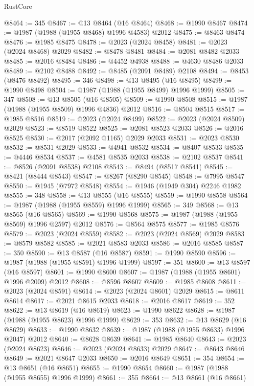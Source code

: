 \begin{lexlean}{RustCore}
\begin{coremodule}
@8464 := 345
@8467 := @13 @8464 (@16 @8464)
@8468 := @1990 @8467
@8474 := @1987 (@1988 (@1955 @8468) @1996 @4583) @2012
@8475 := @8463 @8474
@8476 := @1985 @8475
@8478 := @2023 (@2024 @8458)
@8481 := @2023 (@2024 @8468) @2029
@8482 := @8478 @8481
@8484 := @2081 @8482 @2033
@8485 := @2016 @8484
@8486 := @4452 @4938
@8488 := @4630 @8486 @2033
@8489 := @2102 @8488
@8492 := @8485 (@2091 @8489) @2108
@8494 := @8453 (@8476 @8492)
@8495 := 346
@8498 := @13 @8495 (@16 @8495)
@8499 := @1990 @8498
@8504 := @1987 (@1988 (@1955 @8499) @1996 @1999)
@8505 := 347
@8508 := @13 @8505 (@16 @8505)
@8509 := @1990 @8508
@8515 := @1987 (@1988 (@1955 @8509) @1996 @4836) @2012
@8516 := @8504 @8515
@8517 := @1985 @8516
@8519 := @2023 (@2024 @8499)
@8522 := @2023 (@2024 @8509) @2029
@8523 := @8519 @8522
@8525 := @2081 @8523 @2033
@8526 := @2016 @8525
@8530 := @2017 (@2092 @1165) @2029 @2033
@8531 := @2023 @8530
@8532 := @8531 @2029
@8533 := @4941 @8532
@8534 := @8407 @8533
@8535 := @4446 @8534
@8537 := @4581 @8535 @2033
@8538 := @2102 @8537
@8541 := @8526 (@2091 @8538) @2108
@8543 := @8494 (@8517 @8541)
@8545 := @8421 (@8444 @8543)
@8547 := @8267 (@8290 @8545)
@8548 := @7995 @8547
@8550 := @1945 (@7972 @8548)
@8554 := @1946 (@1949 @304) @2246 @1982
@8555 := 348
@8558 := @13 @8555 (@16 @8555)
@8559 := @1990 @8558
@8564 := @1987 (@1988 (@1955 @8559) @1996 @1999)
@8565 := 349
@8568 := @13 @8565 (@16 @8565)
@8569 := @1990 @8568
@8575 := @1987 (@1988 (@1955 @8569) @1996 @2597) @2012
@8576 := @8564 @8575
@8577 := @1985 @8576
@8579 := @2023 (@2024 @8559)
@8582 := @2023 (@2024 @8569) @2029
@8583 := @8579 @8582
@8585 := @2021 @8583 @2033
@8586 := @2016 @8585
@8587 := 350
@8590 := @13 @8587 (@16 @8587)
@8591 := @1990 @8590
@8596 := @1987 (@1988 (@1955 @8591) @1996 @1999)
@8597 := 351
@8600 := @13 @8597 (@16 @8597)
@8601 := @1990 @8600
@8607 := @1987 (@1988 (@1955 @8601) @1996 @2009) @2012
@8608 := @8596 @8607
@8609 := @1985 @8608
@8611 := @2023 (@2024 @8591)
@8614 := @2023 (@2024 @8601) @2029
@8615 := @8611 @8614
@8617 := @2021 @8615 @2033
@8618 := @2016 @8617
@8619 := 352
@8622 := @13 @8619 (@16 @8619)
@8623 := @1990 @8622
@8628 := @1987 (@1988 (@1955 @8623) @1996 @1999)
@8629 := 353
@8632 := @13 @8629 (@16 @8629)
@8633 := @1990 @8632
@8639 := @1987 (@1988 (@1955 @8633) @1996 @2047) @2012
@8640 := @8628 @8639
@8641 := @1985 @8640
@8643 := @2023 (@2024 @8623)
@8646 := @2023 (@2024 @8633) @2029
@8647 := @8643 @8646
@8649 := @2021 @8647 @2033
@8650 := @2016 @8649
@8651 := 354
@8654 := @13 @8651 (@16 @8651)
@8655 := @1990 @8654
@8660 := @1987 (@1988 (@1955 @8655) @1996 @1999)
@8661 := 355
@8664 := @13 @8661 (@16 @8661)

\end{coremodule}
\end{lexlean}
